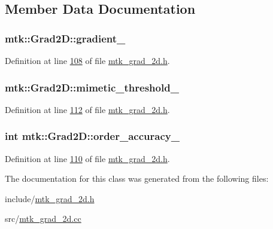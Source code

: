 \subsection{Member Data Documentation}
\hypertarget{classmtk_1_1Grad2D_a22b5ad8454b013e365257dcae04d87a4}{
\subsubsection[{gradient\+\_\+}]{ mtk\+::\+Grad2\+D\+::gradient\+\_\+\hspace{0.3cm}{\ttfamily [private]}}}\label{classmtk_1_1Grad2D_a22b5ad8454b013e365257dcae04d87a4}


Definition at line \hyperlink{mtk__grad__2d_8h_source_l00108}{108} of file \hyperlink{mtk__grad__2d_8h_source}{mtk\+\_\+grad\+\_\+2d.\+h}.

\hypertarget{classmtk_1_1Grad2D_a2bc4debde55eb2c2bc50cef7ceb60cfd}{
\subsubsection[{mimetic\+\_\+threshold\+\_\+}]{ mtk\+::\+Grad2\+D\+::mimetic\+\_\+threshold\+\_\+\hspace{0.3cm}{\ttfamily [private]}}}\label{classmtk_1_1Grad2D_a2bc4debde55eb2c2bc50cef7ceb60cfd}


Definition at line \hyperlink{mtk__grad__2d_8h_source_l00112}{112} of file \hyperlink{mtk__grad__2d_8h_source}{mtk\+\_\+grad\+\_\+2d.\+h}.

\hypertarget{classmtk_1_1Grad2D_ab028aa2889a2f5d59f52e01691b1b9eb}{
\subsubsection[{order\+\_\+accuracy\+\_\+}]{\setlength{\rightskip}{0pt plus 5cm}int mtk\+::\+Grad2\+D\+::order\+\_\+accuracy\+\_\+\hspace{0.3cm}{\ttfamily [private]}}}\label{classmtk_1_1Grad2D_ab028aa2889a2f5d59f52e01691b1b9eb}


Definition at line \hyperlink{mtk__grad__2d_8h_source_l00110}{110} of file \hyperlink{mtk__grad__2d_8h_source}{mtk\+\_\+grad\+\_\+2d.\+h}.



The documentation for this class was generated from the following files\+:\begin{DoxyCompactItemize}
\item 
include/\hyperlink{mtk__grad__2d_8h}{mtk\+\_\+grad\+\_\+2d.\+h}\item 
src/\hyperlink{mtk__grad__2d_8cc}{mtk\+\_\+grad\+\_\+2d.\+cc}\end{DoxyCompactItemize}
